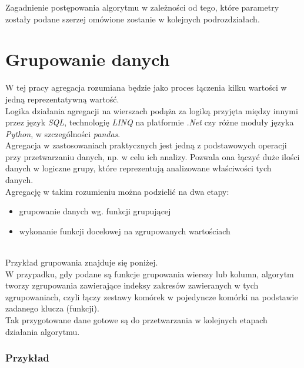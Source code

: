 \documentclass[brudnopis]{xmgr}
\begin{document}
Zagadnienie postępowania algorytmu w zależności od tego, które parametry zostały podane szerzej omówione zostanie w kolejnych podrozdziałach.

\section{Grupowanie danych}

W tej pracy agregacja rozumiana będzie jako proces łączenia kilku wartości w jedną reprezentatywną wartość.
\medskip\\

Logika działania agregacji na wierszach podąża za logiką przyjęta między innymi przez język \emph{SQL}, technologię \emph{LINQ} na platformie \emph{.Net} czy różne moduły języka \emph{Python}, w szczególności \emph{pandas}.
\medskip\\

Agregacja w zastosowaniach praktycznych jest jedną z podstawowych operacji przy przetwarzaniu danych, np. w celu ich analizy.
Pozwala ona łączyć duże ilości danych w logiczne grupy, które reprezentują analizowane właściwości tych danych.
\medskip\\

Agregację w takim rozumieniu można podzielić na dwa etapy:
\begin{itemize}
    \item grupowanie danych wg. funkcji grupującej
    \item wykonanie funkcji docelowej na zgrupowanych wartościach
\end{itemize}
\medskip\\

Przykład grupowania znajduje się poniżej.
\medskip\\

W przypadku, gdy podane są funkcje grupowania wierszy lub kolumn, algorytm tworzy zgrupowania zawierające indeksy zakresów zawieranych w tych zgrupowaniach, czyli łączy zestawy komórek w pojedyncze komórki na podstawie zadanego klucza (funkcji).
\medskip\\

Tak przygotowane dane gotowe są do przetwarzania w kolejnych etapach działania algorytmu.

\newpage
\subsubsection{Przykład}
\medskip\\
\end{document}
